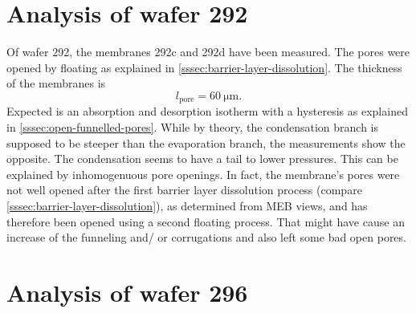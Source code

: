\documentclass[thesis.tex]{subfiles}
\begin{document}
    \section{Analysis of wafer 292}
    \label{sec:wafer292}

        Of wafer 292, the membranes 292c and 292d have been measured. The pores were opened by floating as explained in \cref{sssec:barrier-layer-dissolution}. The thickness of the membranes is
        \begin{equation}
            l_\mathrm{pore}=\SI{60}{\micro\meter}.
        \end{equation}
        Expected is an absorption and desorption isotherm with a hysteresis as explained in \cref{sssec:open-funnelled-pores}.
        While by theory, the condensation branch is supposed to be steeper than the evaporation branch, the measurements show the opposite.
        The condensation seems to have a tail to lower pressures. This can be explained by inhomogenuous pore openings. In fact, the membrane's
        pores were not well opened after the first barrier layer dissolution process (compare \cref{sssec:barrier-layer-dissolution}), as determined
        from MEB views, and has therefore been opened using a second floating process. That might have cause an increase of the funneling and/ or
        corrugations and also left some bad open pores.


    \section{Analysis of wafer 296}
    \label{sec:wafer296}
\end{document}
